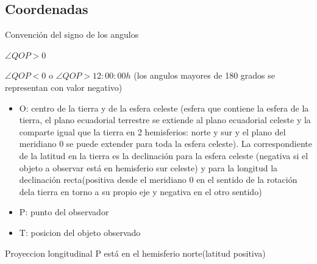 \documentclass{article}
\begin{document}
\subsection*{Coordenadas}
Convención del signo de los angulos

$\angle{QOP} > 0$

$\angle{QOP} < 0$  o $\angle{QOP} > 12:00:00h $ (los angulos mayores de 180 grados se representan con valor negativo)



\begin{itemize}
\item O: centro de la tierra y de la esfera celeste (esfera que contiene la esfera de la tierra, el plano ecuadorial terrestre se extiende al plano ecuadorial celeste y la comparte igual que la tierra en 2 hemisferios: norte y sur y el plano del meridiano 0 se puede extender para toda la esfera celeste). La correspondiente de la latitud en la tierra es la declinación para la esfera celeste (negativa si el objeto a observar está en hemisferio sur celeste) y para la longitud la declinación recta(positiva desde el meridiano 0 en el sentido de la rotación dela tierra en torno a su propio eje y negativa en el otro sentido)
\item P: punto del observador
\item T: posicion del objeto observado
\end{itemize}

Proyeccion longitudinal
P está en el hemisferio norte(latitud positiva) 
\vspace{5cm}
\end{document}
